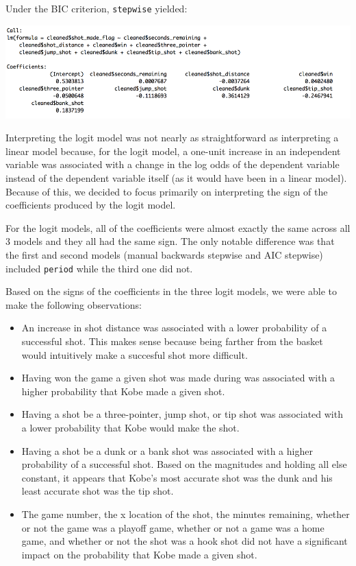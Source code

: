 \documentclass[paper=a4, fontsize=11pt]{scrartcl} %
\numberwithin{equation}{section} %
\numberwithin{figure}{section} %
\numberwithin{table}{section} %
\begin{document}
\hspace*{1cm} Under the BIC criterion, \texttt{stepwise} yielded:
\begin{center}
	\includegraphics[width=14cm]{img/lmbic}
\end{center}
\hspace*{1cm}Interpreting the logit model was not nearly as straightforward as interpreting a linear model because, for the logit model, a one-unit increase in an independent variable was associated with a change in the log odds of the dependent variable instead of the dependent variable itself (as it would have been in a linear model). Because of this, we decided to focus primarily on interpreting the sign of the coefficients produced by the logit model.

\hspace*{1cm}For the logit models, all of the coefficients were almost exactly the same across all 3 models and they all had the same sign. The only notable difference was that the first and second models (manual backwards stepwise and AIC stepwise) included \texttt{period} while the third one did not. 

\hspace*{1cm}Based on the signs of the coefficients in the three logit models, we were able to make the following observations: 
\begin{itemize}
\item An increase in shot distance was associated with a lower probability of a successful shot. This makes sense because being farther from the basket would intuitively make a succesful shot more difficult. 
\item Having won the game a given shot was made during was associated with a higher probability that Kobe made a given shot.
\item Having a shot be a three-pointer, jump shot, or tip shot was associated with a lower probability that Kobe would make the shot. 
\item Having a shot be a dunk or a bank shot was associated with a higher probability of a successful shot. Based on the magnitudes and holding all else constant, it appears that Kobe's most accurate shot was the dunk and his least accurate shot was the tip shot. 
\item The game number, the x location of the shot, the minutes remaining, whether or not the game was a playoff game, whether or not a game was a home game, and whether or not the shot was a hook shot did not have a significant impact on the probability that Kobe made a given shot. 
\end{itemize}
\end{document}
